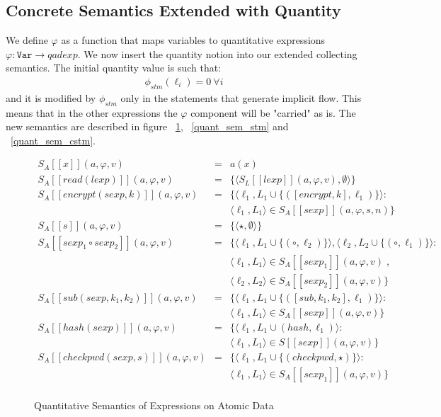 \documentclass{llncs}
\begin{document}
\subsection{Concrete Semantics Extended with Quantity}
We define $\varphi$ as a function that maps variables to quantitative expressions $\varphi : \texttt{Var} \rightarrow qadexp$. We now insert the quantity notion into our extended collecting semantics. The initial quantity value is such that: 
\begin{align*}
\phi_{stm} (\ell_i) = 0\ \forall i
\end{align*}
and it is modified by $\phi_{stm}$ only in the statements that generate implicit flow. This means that in the other expressions the $\varphi$ component will be "carried" as is. The new semantics are described in figure ~\ref{quant_sem_ad}, ~\ref{quant_sem_stm} and ~\ref{quant_sem_cstm}. 

\begin{figure}[H]
{\small \[
\begin{array}{rcl}
S_A [\![ x ]\!](a, \varphi, v) &=&  a(x)  \\
S_A [\![read(lexp)]\!](a, \varphi, v) & = & \{ \langle S_L [\![lexp ]\!](a, \varphi, v), \emptyset\rangle \}\\
S_A [\![ encrypt(sexp,k) ]\!](a, \varphi, v) &=& \{ \langle \ell_1, L_1 \cup \{([encrypt,k], \ell_1)\} \rangle : \;\\
& & \langle \ell_1, L_1 \rangle \in  S_A [\![sexp ]\!](a, \varphi, s, n) \}\; \\
S_A [\![ s]\!](a, \varphi, v) & = & \{ \langle \star, \emptyset\rangle \} \\
S_A [\![ sexp_1 \circ sexp_2 ]\!](a, \varphi, v) & = &
\{  \langle \ell_1, L_1 \cup \{(\circ, \ell_2)\} \rangle,  \langle \ell_2, L_2 \cup \{(\circ , \ell_1) \} \rangle : \; \\
& & \langle \ell_1, L_1 \rangle \in  S_A [\![sexp_1 ]\!](a, \varphi, v) \; ,\\
& & \langle \ell_2, L_2 \rangle \in  S_A [\![sexp_2]\!](a, \varphi, v) \}\; \\
S_A [\![ sub(sexp, k_1, k_2) ]\!](a, \varphi, v) & = &
\{  \langle \ell_1, L_1 \cup \{([sub,  k_1, k_2],\ell_1)\} \rangle: \\
& & \langle \ell_1, L_1\rangle \in  S_A [\![sexp ]\!](a, \varphi, v)\}\;\\
S_A [\![ hash(sexp) ]\!](a, \varphi, v) &=& \{ \langle \ell_1, L_1 \cup (hash,\ell_1) \rangle : \;\\
& &   \langle \ell_1,  L_1 \rangle \in  S [\![sexp ]\!](a, \varphi, v) \}\; \\
S_A [\![ checkpwd(sexp, s) ]\!](a, \varphi, v) & = &
\{  \langle \ell_1, L_1 \cup \{(checkpwd, \star)\} \rangle : \;\\
& & \langle \ell_1, L_1 \rangle \in  S_A [\![sexp_1 ]\!](a, \varphi, v) \}\; \\
\end{array}
\]}
\caption{Quantitative Semantics of Expressions on Atomic Data}
\label{quant_sem_ad}
\end{figure}
\end{document}

